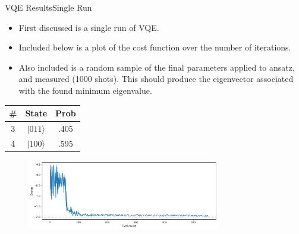 \begin{frame}{VQE Results}{Single Run}
\begin{itemize}
    \item First discussed is a single run of VQE. 
    \item Included below is a plot of the cost function over the number of iterations. 
    \item Also included is a random sample of the final parameters applied to ansatz, and measured (1000 shots). This should produce the eigenvector associated with the found minimum eigenvalue.
\end{itemize}
\begin{tabular}{c|c|c}
   \# & State & Prob \\
   \hline
   3  & $|011\rangle$ & .405 \\
   4 & $|100 \rangle$ & .595
\end{tabular}

\begin{figure}
    \vspace{-12 mm}
    \includegraphics[width=0.75\textwidth]{400/VQE_MC.png}
    \label{fig:enter-label}
\end{figure}

\end{frame}

